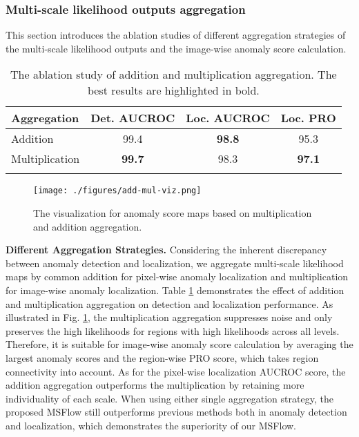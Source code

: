 \documentclass[lettersize,journal]{IEEEtran}
\newcommand{\myrule}{\specialrule{.1em}{.0ex}{.0ex}}
\begin{document}
\subsubsection{Multi-scale likelihood outputs aggregation} This section introduces the ablation studies of different aggregation strategies of the multi-scale likelihood outputs and the image-wise anomaly score calculation. 

\begin{table}[t]
  \centering
  \caption{The ablation study of addition and multiplication aggregation. The best results are highlighted in bold.}  \label{tab:as-aggregation}
  \begin{tabular}{l|c|c|c}
  \myrule
  Aggregation    & Det. AUCROC    & Loc. AUCROC     & Loc. PRO      \\ \hline
  Addition       & 99.4          & \textbf{98.8} & 95.3          \\
  Multiplication & \textbf{99.7} & 98.3          & \textbf{97.1} \\ \myrule
  \end{tabular}
  \end{table}

  
\begin{figure}[h]
  \centering
  \texttt{[image: ./figures/add-mul-viz.png]}
  \caption{The visualization for anomaly score maps based on multiplication and addition aggregation.}
  \label{fig:add-mul-viz}
\end{figure}

\vspace{3pt}\textbf{Different Aggregation Strategies.}
Considering the inherent discrepancy between anomaly detection and localization, we aggregate multi-scale likelihood maps by common addition for pixel-wise anomaly localization and multiplication for image-wise anomaly localization. Table \ref{tab:as-aggregation} demonstrates the effect of addition and multiplication aggregation on detection and localization performance. As illustrated in Fig. \ref{fig:add-mul-viz}, the multiplication aggregation suppresses noise and only preserves the high likelihoods for regions with high likelihoods across all levels. Therefore, it is suitable for image-wise anomaly score calculation by averaging the largest  anomaly scores and the region-wise PRO score, which takes region connectivity into account. As for the pixel-wise localization AUCROC score, the addition aggregation outperforms the multiplication by retaining more individuality of each scale. 
When using either single aggregation strategy, the proposed MSFlow still outperforms previous methods both in anomaly detection and localization, which demonstrates the superiority of our MSFlow.
\end{document}
